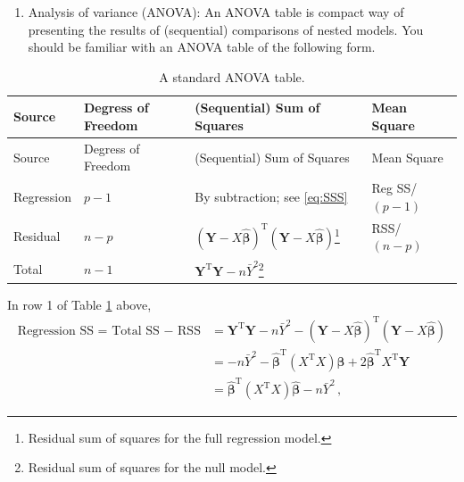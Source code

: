 \documentclass[
]{book}
\providecommand{\tightlist}{%
  \setlength{\itemsep}{0pt}\setlength{\parskip}{0pt}}
\theoremstyle{definition}
\theoremstyle{definition}
\theoremstyle{definition}
\theoremstyle{definition}
\theoremstyle{remark}
\begin{document}
\begin{enumerate}
\def\labelenumi{\arabic{enumi}.}
\setcounter{enumi}{1}
\tightlist
\item
  Analysis of variance (ANOVA): An ANOVA table is compact way of presenting the results of (sequential) comparisons of nested models. You should be familiar with an ANOVA table of the following form.
\end{enumerate}

\begin{longtable}[]{@{}
  >{\raggedright\arraybackslash}p{}
  >{\raggedright\arraybackslash}p{}
  >{\raggedright\arraybackslash}p{}
  >{\raggedright\arraybackslash}p{}@{}}
\caption{\label{tab:anova} A standard ANOVA table.}\tabularnewline
\toprule
Source & Degress of Freedom & (Sequential) Sum of Squares & Mean Square \\
\midrule
\endfirsthead
\toprule
Source & Degress of Freedom & (Sequential) Sum of Squares & Mean Square \\
\midrule
\endhead
Regression & \(p-1\) & By subtraction; see \eqref{eq:SSS} & Reg SS/\((p-1)\) \\
Residual & \(n-p\) & \((\boldsymbol{Y}-X\hat{\boldsymbol{\beta}})^{\textrm{T}}(\boldsymbol{Y}-X\hat{\boldsymbol{\beta}})\)\footnote{Residual sum of squares for the full regression model.} & RSS/\((n-p)\) \\
Total & \(n-1\) & \(\boldsymbol{Y}^{\textrm{T}}\boldsymbol{Y}-n\bar{Y}^{2}\)\footnote{Residual sum of squares for the null model.} & \\
\bottomrule
\end{longtable}

In row 1 of Table \ref{tab:anova} above,
\begin{align}
\textrm{Regression SS = Total SS $-$ RSS} & = \boldsymbol{Y}^{\textrm{T}}\boldsymbol{Y} - n\bar{Y}^{2} - (\boldsymbol{Y}-X\hat{\boldsymbol{\beta}})^{\textrm{T}}(\boldsymbol{Y}-X\hat{\boldsymbol{\beta}})\\
& = -n\bar{Y}^{2}-\hat{\boldsymbol{\beta}}^{\textrm{T}}(X^{\textrm{T}}X)\hat{\boldsymbol{\beta}}+2\hat{\boldsymbol{\beta}}^{\textrm{T}}X^{\textrm{T}}\boldsymbol{Y} \\
& = \hat{\boldsymbol{\beta}}^{\textrm{T}}(X^{\textrm{T}}X)\hat{\boldsymbol{\beta}}-n\bar{Y}^{2}\,,
\label{eq:SSS}
\end{align}
\end{document}
